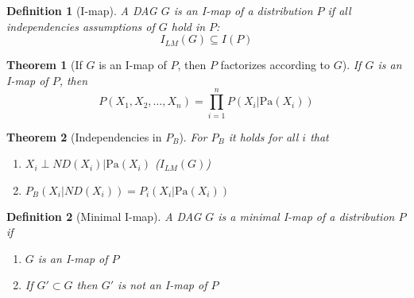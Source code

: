 \documentclass[11pt]{article}
\numberwithin{equation}{section}
\theoremstyle{boldStyle}
\theoremstyle{boldBlueStyle}
\theoremstyle{boldPurpleStyle}
\newtheorem{theorem}{Theorem}[section]
\theoremstyle{boldRedStyle}
\newtheorem{definition}{Definition}[section]
\begin{document}
\begin{definition}[I-map]
    A DAG $G$ is an I-map of a distribution $P$ if all independencies assumptions of $G$ hold in $P$:
    \begin{equation*}
        I_{LM}(G) \subseteq I(P)
    \end{equation*}
\end{definition}

\begin{theorem}[If $G$ is an I-map of $P$, then $P$ factorizes according to $G$]
    If $G$ is an I-map of $P$, then
    \begin{equation*}
        P(X_1, X_2, \ldots, X_n) = \prod_{i=1}^{n} P(X_i | \text{Pa}(X_i))
    \end{equation*}
\end{theorem}

\begin{theorem}[Independencies in $P_B$]
    For $P_B$ it holds for all $i$ that
    \begin{enumerate}
        \item $X_i \perp ND(X_i) | \text{Pa}(X_i)$  \quad  ($I_{LM}(G)$)
        \item $P_B(X_i | ND(X_i)) = P_i(X_i | \text{Pa}(X_i))$
    \end{enumerate}
\end{theorem}

\begin{definition}[Minimal I-map]
    A DAG $G$ is a minimal I-map of a distribution $P$ if 
    \begin{enumerate}
        \item $G$ is an I-map of $P$
        \item If $G' \subset G$ then $G'$ is not an I-map of $P$
    \end{enumerate}
\end{definition}
\end{document}
